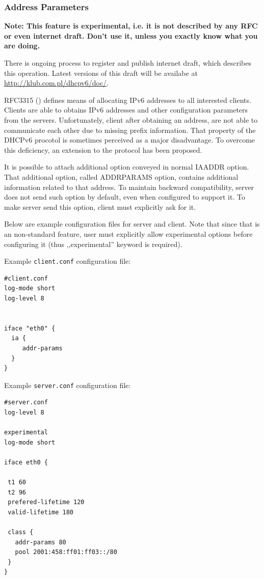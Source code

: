 \subsubsection{Address Parameters}

\textbf{Note: This feature is experimental, i.e. it is not described
by any RFC or even internet draft. Don't use it, unless you exactly
know what you are doing.}

There is ongoing process to register and publish internet draft,
which describes this operation. Latest versions of this draft will be
availabe at \url{http://klub.com.pl/dhcpv6/doc/}.

RFC3315 (\cite{rfc3315}) defines means of allocating IPv6 addresses to
all interested clients. Clients are able to obtains IPv6 addresses and
other configuration parameters from the servers. Unfortunately, client
after obtaining an address, are not able to communicate each other due
to missing prefix information. That property of the DHCPv6 procotol is
sometimes perceived as a major disadvantage. To overcome this
deficiency, an extension to the protocol has been proposed.

It is possible to attach additional option conveyed in normal IAADDR
option. That additional option, called ADDRPARAMS option, contains
additional information related to that address. To maintain backward
compatibility, server does not send such option by default, even when
configured to support it. To make server send this option, client must
explicitly ask for it. 

Below are example configuration files for server and client. Note that
since that is an non-standard feature, user must explicitly allow
experimental options before configuring it (thus ,,experimental''
keyword is required).

Example \verb+client.conf+ configuration file:

\begin{lstlisting}
#client.conf
log-mode short
log-level 8


iface "eth0" {
  ia { 
     addr-params 
  }
}
\end{lstlisting}

Example \verb+server.conf+ configuration file:

\begin{lstlisting}
#server.conf
log-level 8

experimental
log-mode short

iface eth0 {

 t1 60
 t2 96
 prefered-lifetime 120
 valid-lifetime 180

 class {
   addr-params 80
   pool 2001:458:ff01:ff03::/80
 }
}
\end{lstlisting}
